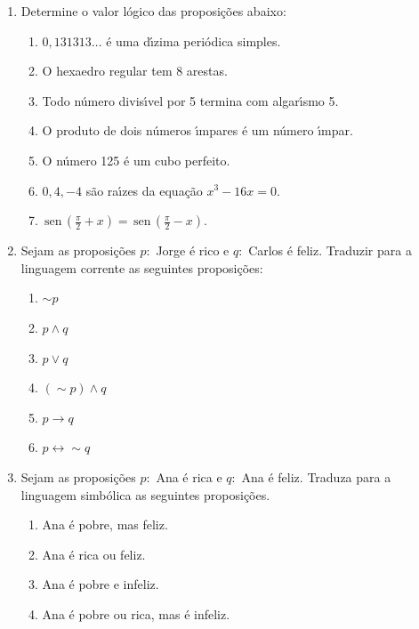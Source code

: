 \documentclass[a4paper,5pt]{amsbook}
\newcommand{\sen}{\,\mbox{sen}\,}
\renewcommand{\lnot}{\sim}
\begin{document}
\vspace{1cm}
\begin{enumerate}
    \item Determine o valor l\'ogico das proposi\c{c}\~oes abaixo:
        \begin{enumerate}
            \item $0,131313\ldots$ \'e uma d\'{\i}zima peri\'odica simples.
            \item O hexaedro regular tem 8 arestas.
            \item Todo n\'umero divis\'{\i}vel por 5 termina com algar\'{\i}smo 5.
            \item O produto de dois n\'umeros \'{\i}mpares \'e um n\'umero \'{\i}mpar.
            \item O n\'umero 125 \'e um cubo perfeito.
            \item $0, 4, -4$ s\~ao ra\'{\i}zes da equa\c{c}\~ao $x^3-16x=0$.
            \item $\sen{\left(\frac{\pi}{2}+x\right)} = \sen{\left(\frac{\pi}{2}-x\right)}$.
        \end{enumerate}

    \vspace{0.5cm}
    \item Sejam as proposi\c{c}\~oes $p:$ Jorge \'e rico e $q:$ Carlos \'e feliz.
    Traduzir para a linguagem corrente as seguintes proposi\c{c}\~oes:
        \begin{enumerate}
            \item $\lnot p$
            \item $p\land q$
            \item $p\lor q$
            \item $(\lnot p) \land q$
            \item $p\rightarrow q$
            \item $p\leftrightarrow \lnot q$
        \end{enumerate}

    \vspace{0.5cm}
    \item Sejam as proposi\c{c}\~oes $p:$ Ana \'e rica e $q:$ Ana \'e feliz. Traduza para
    a linguagem simb\'olica as seguintes proposi\c{c}\~oes.
        \begin{enumerate}
            \item Ana \'e pobre, mas feliz.
            \item Ana \'e rica ou feliz.
            \item Ana \'e pobre e infeliz.
            \item Ana \'e pobre ou rica, mas \'e infeliz.
        \end{enumerate}


\end{enumerate}
\end{document}
